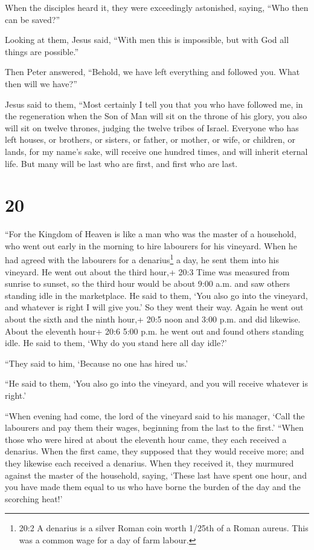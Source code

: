  When the disciples heard it, they were exceedingly
astonished, saying, ``Who then can be saved?''

 Looking at them, Jesus said, ``With men this is
impossible, but with God all things are possible.''

 Then Peter answered, ``Behold, we have left everything and
followed you. What then will we have?''

 Jesus said to them, ``Most certainly I tell you that you
who have followed me, in the regeneration when the Son of Man will sit
on the throne of his glory, you also will sit on twelve thrones, judging
the twelve tribes of Israel.  Everyone who has left houses,
or brothers, or sisters, or father, or mother, or wife, or children, or
lands, for my name's sake, will receive one hundred times, and will
inherit eternal life.  But many will be last who are first,
and first who are last.

\hypertarget{section-19}{%
\section{20}\label{section-19}}

 ``For the Kingdom of Heaven is like a man who was the
master of a household, who went out early in the morning to hire
labourers for his vineyard.  When he had agreed with the
labourers for a denarius\footnote{20:2 A denarius is a silver Roman coin
  worth 1/25th of a Roman aureus. This was a common wage for a day of
  farm labour.} a day, he sent them into his vineyard.  He
went out about the third hour,+ 20:3 Time was measured from sunrise to
sunset, so the third hour would be about 9:00 a.m. and saw others
standing idle in the marketplace.  He said to them, `You
also go into the vineyard, and whatever is right I will give you.' So
they went their way.  Again he went out about the sixth and
the ninth hour,+ 20:5 noon and 3:00 p.m. and did likewise. 
About the eleventh hour+ 20:6 5:00 p.m. he went out and found others
standing idle. He said to them, `Why do you stand here all day idle?'

 ``They said to him, `Because no one has hired us.'

``He said to them, `You also go into the vineyard, and you will receive
whatever is right.'

 ``When evening had come, the lord of the vineyard said to
his manager, `Call the labourers and pay them their wages, beginning
from the last to the first.'  ``When those who were hired at
about the eleventh hour came, they each received a denarius.
 When the first came, they supposed that they would receive
more; and they likewise each received a denarius.  When
they received it, they murmured against the master of the household,
 saying, `These last have spent one hour, and you have made
them equal to us who have borne the burden of the day and the scorching
heat!'

